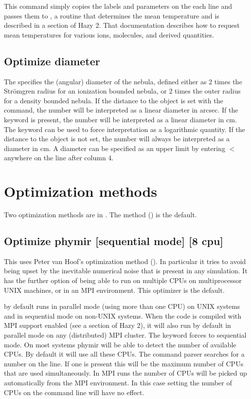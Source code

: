 This command simply copies the labels and parameters on the each line
and passes them to ,
a routine that determines the mean temperature
and is described in a section of Hazy 2.
That documentation describes
how to request mean temperatures for various ions, molecules, and derived
quantities.

\subsection{Optimize diameter}

The specifies the (angular) diameter of the nebula, defined either as 2 times
the Str\"omgren radius for an ionization bounded nebula, or 2 times the outer
radius for a density bounded nebula. If the distance to the object is set with
the  command, the number will be interpreted as a linear
diameter in arcsec. If the keyword  is present, the number
will be interpreted as a linear diameter in cm. The keyword 
can be used to force interpretation as a logarithmic quantity. If the distance
to the object is not set, the number will always be interpreted as a diameter
in cm.
A diameter can be specified as an upper limit by entering
$<$ anywhere on the line after column 4.

\section{Optimization methods}
\label{sec:optimization_methods}

Two optimization methods are in \Cloudy.
The  method (\citealp{VanHoof1997}) is the default.

\subsection{Optimize phymir [sequential mode] [8 cpu]}
\label{sec:OptPhymir}

This uses Peter van Hoof's  optimization method
(\citealp{VanHoof1997}). In particular it tries to avoid being upset by the
inevitable numerical noise that is present in any simulation. It has the
further option of being able to run on multiple CPUs on multiprocessor UNIX
machines, or in an MPI environment. This optimizer is the default.

 by default runs in parallel mode (using more than one CPU) on
UNIX systems and in sequential mode on non-UNIX systems. When the code is
compiled with MPI support enabled (see a section of Hazy 2), it will also run
by default in parallel mode on any (distributed) MPI cluster. The keyword
 forces  to sequential mode. On most
systems phymir will be able to detect the number of available CPUs. By default
it will use all these CPUs. The command parser searches for a number on the
line. If one is present this will be the maximum number of CPUs that are used
simultaneously. In MPI runs the number of CPUs will be picked up automatically
from the MPI environment. In this case setting the number of CPUs on the
command line will have no effect.

